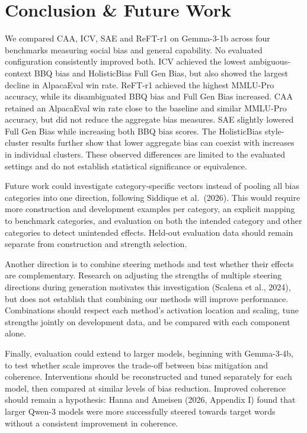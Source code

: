 \documentclass{article}
\begin{document}
\section{Conclusion \& Future Work}

We compared CAA, ICV, SAE and ReFT-r1 on Gemma-3-1b across four benchmarks measuring social bias and general capability. No evaluated configuration consistently improved both. ICV achieved the lowest ambiguous-context BBQ bias and HolisticBias Full Gen Bias, but also showed the largest decline in AlpacaEval win rate. ReFT-r1 achieved the highest MMLU-Pro accuracy, while its disambiguated BBQ bias and Full Gen Bias increased. CAA retained an AlpacaEval win rate close to the baseline and similar MMLU-Pro accuracy, but did not reduce the aggregate bias measures. SAE slightly lowered Full Gen Bias while increasing both BBQ bias scores. The HolisticBias style-cluster results further show that lower aggregate bias can coexist with increases in individual clusters. These observed differences are limited to the evaluated settings and do not establish statistical significance or equivalence.

Future work could investigate category-specific vectors instead of pooling all bias categories into one direction, following Siddique et al.\ (2026). This would require more construction and development examples per category, an explicit mapping to benchmark categories, and evaluation on both the intended category and other categories to detect unintended effects. Held-out evaluation data should remain separate from construction and strength selection.

Another direction is to combine steering methods and test whether their effects are complementary. Research on adjusting the strengths of multiple steering directions during generation motivates this investigation (Scalena et al., 2024), but does not establish that combining our methods will improve performance. Combinations should respect each method's activation location and scaling, tune strengths jointly on development data, and be compared with each component alone.

Finally, evaluation could extend to larger models, beginning with Gemma-3-4b, to test whether scale improves the trade-off between bias mitigation and coherence. Interventions should be reconstructed and tuned separately for each model, then compared at similar levels of bias reduction. Improved coherence should remain a hypothesis: Hanna and Ameisen (2026, Appendix I) found that larger Qwen-3 models were more successfully steered towards target words without a consistent improvement in coherence.
\end{document}
